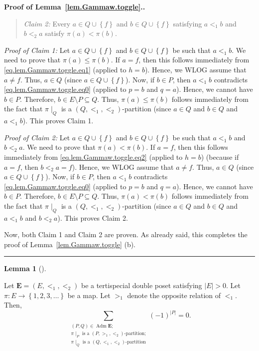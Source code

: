 \documentclass[numbers=enddot,12pt,final,onecolumn,notitlepage,abstracton]{scrartcl}
\theoremstyle{definition}
\newtheorem{lem}[theo]{Lemma}
\newenvironment{lemma}[1][]
{\begin{lem}[#1]\begin{leftbar}}
{\end{leftbar}\end{lem}}
\newenvironment{statement}{\begin{quote}}{\end{quote}}
\newenvironment{proof}[1][Proof]{\noindent\textbf{#1.} }{\ \rule{0.5em}{0.5em}}
\let\sumnonlimits\sum
\renewcommand{\sum}{\sumnonlimits\limits}
\newcommand{\Adm}{\operatorname{Adm}}
\newcommand{\EE}{{\mathbf{E}}}
\begin{document}
\begin{proof}[Proof of Lemma~\ref{lem.Gammaw.toggle}.]
\begin{statement}
\textit{Claim 2:} Every $a\in Q\cup\left\{  f\right\}  $ and $b\in
Q\cup\left\{  f\right\}  $ satisfying $a<_{1}b$ and $b<_{2}a$ satisfy
$\pi\left(  a\right)  <\pi\left(  b\right)  $.
\end{statement}

\textit{Proof of Claim 1:} Let $a\in Q\cup\left\{  f\right\}  $ and $b\in
Q\cup\left\{  f\right\}  $ be such that $a<_{1}b$. We need to prove that
$\pi\left(  a\right)  \leq\pi\left(  b\right)  $. If $a=f$, then this follows
immediately from \eqref{eq.lem.Gammaw.toggle.eq1} (applied to $h=b$).
Hence, we WLOG assume that $a\neq f$. Thus, $a\in Q$ (since $a\in
Q\cup\left\{  f\right\}  $). Now, if $b\in P$, then $a<_{1}b$ contradicts
\eqref{eq.lem.Gammaw.toggle.eq0} (applied to $p=b$ and $q=a$). Hence,
we cannot have $b\in P$. Therefore, $b\in E\setminus P
\subseteq Q$. Thus, $\pi\left(  a\right)  \leq\pi\left(
b\right)  $ follows immediately from the fact that $\pi\mid_{Q}$ is a $\left(
Q,<_{1},<_{2}\right)  $-partition (since $a \in Q$ and $b \in Q$ and
$a <_1 b$).
This proves Claim 1.

\textit{Proof of Claim 2:} Let $a\in Q\cup\left\{  f\right\}  $ and $b\in
Q\cup\left\{  f\right\}  $ be such that $a<_{1}b$ and $b<_{2}a$. We need to
prove that $\pi\left(  a\right)  <\pi\left(  b\right)  $. If $a=f$, then this
follows immediately from \eqref{eq.lem.Gammaw.toggle.eq2} (applied
to $h=b$) (because if $a = f$, then $b <_2 a = f$).
Hence, we WLOG assume that $a\neq f$. Thus, $a\in Q$ (since $a\in
Q\cup\left\{  f\right\}  $). Now, if $b\in P$, then $a<_{1}b$ contradicts
\eqref{eq.lem.Gammaw.toggle.eq0} (applied to $p=b$ and $q=a$). Hence,
we cannot have $b\in P$. Therefore, $b\in E\setminus P \subseteq Q$.
Thus, $\pi\left(  a\right)  <\pi\left(
b\right)  $ follows immediately from the fact that $\pi\mid_{Q}$ is a $\left(
Q,<_{1},<_{2}\right)  $-partition (since $a \in Q$ and $b \in Q$ and
$a <_1 b$ and $b <_2 a$).
This proves Claim 2.

Now, both Claim 1 and Claim 2 are proven. As already said, this
completes the proof of Lemma~\ref{lem.Gammaw.toggle} (b).
\end{proof}

\begin{lemma}
\label{lem.Gammaw.altsum}
Let $\EE = \left(E, <_1, <_2\right)$ be a tertispecial double
poset satisfying $\left|E\right| > 0$.
Let $\pi : E \to \left\{ 1, 2, 3, \ldots \right\}$ be a map.
Let $>_1$ denote the opposite relation of $<_1$. Then,
\begin{equation}
\sum_{\substack{\left(P, Q\right) \in \Adm \EE ; \\
                \pi\mid_P \text{ is a }\left(P, >_1, <_2\right)\text{-partition;} \\
                \pi\mid_Q \text{ is a }\left(Q, <_1, <_2\right)\text{-partition}}}
\left(-1\right)^{\left|P\right|}
= 0 .
\label{pf.thm.antipode.Gammaw.signrev}
\end{equation}
\end{lemma}
\end{document}

